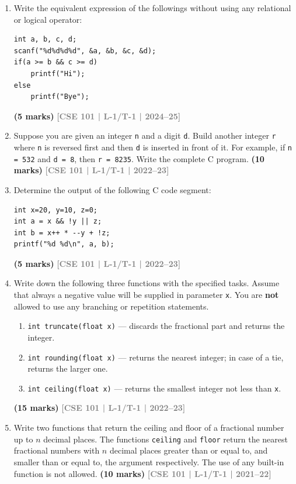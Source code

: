 \documentclass[12pt,a3paper]{article}
\newcommand{\yr}[1]{\hfill\textcolor{gray}{\small\textbf{[#1]}}}
\newcommand{\mk}[1]{\textcolor{orange!70!black}{\small\textbf{(#1 marks)}}}
\begin{document}
\begin{enumerate}

\item Write the equivalent expression of the followings without using any relational or logical operator:
\begin{lstlisting}
int a, b, c, d;
scanf("%d%d%d%d", &a, &b, &c, &d);
if(a >= b && c >= d)
    printf("Hi");
else
    printf("Bye");
\end{lstlisting}
\mk{5} \yr{CSE 101 | L-1/T-1 | 2024--25}


\item Suppose you are given an integer \texttt{n} and a digit \texttt{d}. Build another integer \texttt{r} where \texttt{n} is reversed first and then \texttt{d} is inserted in front of it. For example, if \texttt{n = 532} and \texttt{d = 8}, then \texttt{r = 8235}. Write the complete C program.
\mk{10} \yr{CSE 101 | L-1/T-1 | 2022--23}

\item Determine the output of the following C code segment:
\begin{lstlisting}
int x=20, y=10, z=0;
int a = x && !y || z;
int b = x++ * --y + !z;
printf("%d %d\n", a, b);
\end{lstlisting}
\mk{5} \yr{CSE 101 | L-1/T-1 | 2022--23}

\item Write down the following three functions with the specified tasks. Assume that always a negative value will be supplied in parameter \texttt{x}. You are \textbf{not} allowed to use any branching or repetition statements.
\begin{enumerate}
  \item \texttt{int truncate(float x)} --- discards the fractional part and returns the integer.
  \item \texttt{int rounding(float x)} --- returns the nearest integer; in case of a tie, returns the larger one.
  \item \texttt{int ceiling(float x)} --- returns the smallest integer not less than \texttt{x}.
\end{enumerate}
\mk{15} \yr{CSE 101 | L-1/T-1 | 2022--23}

\item Write two functions that return the ceiling and floor of a fractional number up to $n$ decimal places. The functions \texttt{ceiling} and \texttt{floor} return the nearest fractional numbers with $n$ decimal places greater than or equal to, and smaller than or equal to, the argument respectively. The use of any built-in function is not allowed.
\mk{10} \yr{CSE 101 | L-1/T-1 | 2021--22}


\end{enumerate}
\end{document}
